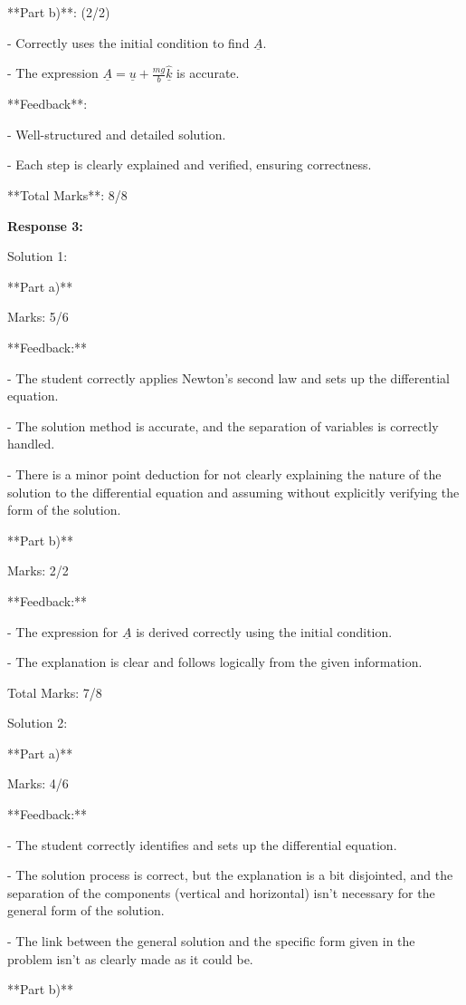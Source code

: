 \documentclass[a4paper,11pt]{article}
\begin{document}
**Part b)**: (2/2)

- Correctly uses the initial condition to find \( \underline{A} \).

- The expression \( \underline{A} = \underline{u} + \frac{mg}{b} \hat{\underline{k}} \) is accurate.

**Feedback**: 

- Well-structured and detailed solution.

- Each step is clearly explained and verified, ensuring correctness.

**Total Marks**: 8/8

\bigskip
\textbf{Response 3:}

Solution 1:

**Part a)** 

Marks: 5/6

**Feedback:**

- The student correctly applies Newton's second law and sets up the differential equation.

- The solution method is accurate, and the separation of variables is correctly handled.

- There is a minor point deduction for not clearly explaining the nature of the solution to the differential equation and assuming without explicitly verifying the form of the solution.

**Part b)** 

Marks: 2/2

**Feedback:**

- The expression for \( \underline{A} \) is derived correctly using the initial condition.

- The explanation is clear and follows logically from the given information.

Total Marks: 7/8

Solution 2:

**Part a)** 

Marks: 4/6

**Feedback:**

- The student correctly identifies and sets up the differential equation.

- The solution process is correct, but the explanation is a bit disjointed, and the separation of the components (vertical and horizontal) isn't necessary for the general form of the solution.

- The link between the general solution and the specific form given in the problem isn't as clearly made as it could be.

**Part b)** 
\end{document}
